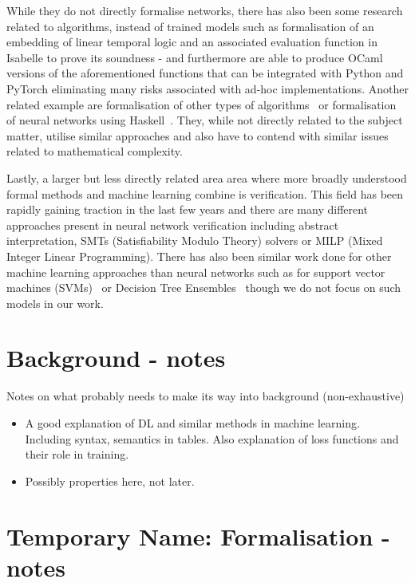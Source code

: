 \documentclass[a4paper,UKenglish,cleveref, autoref, thm-restate]{lipics-v2021}
\begin{document}
While they do not directly formalise networks, there has also been some research related to algorithms, instead of trained models such as formalisation of an embedding of linear temporal logic and an associated evaluation function in Isabelle to prove its soundness - and furthermore are able to produce OCaml versions of the aforementioned functions that can be integrated with Python and PyTorch eliminating many risks associated with ad-hoc implementations\cite{chevallier2022constrained}. Another related example are formalisation of other types of algorithms~\cite{daukantas2021trimming} or formalisation of neural networks using Haskell~\cite{xie2023haskell}. They, while not directly related to the subject matter, utilise similar approaches and also have to contend with similar issues related to mathematical complexity.

Lastly, a larger but less directly related area area where more broadly understood formal methods and machine learning combine is verification. This field has been rapidly gaining traction in the last few years and there are many different approaches present in neural network verification\cite{urban2021review,9842406,easterbrook1998formal} including abstract interpretation, SMTs (Satisfiability Modulo Theory) \cite{katz2019marabou} solvers or MILP (Mixed Integer Linear Programming). There has also been similar work done for other machine learning approaches than neural networks such as for support vector machines (SVMs)~\cite{ranzato2019robustness} or Decision Tree Ensembles~\cite{einziger2019verifying} though we do not focus on such models in our work. 




\section{Background - notes}


Notes on what probably needs to make its way into background (non-exhaustive)
\begin{itemize}
	\item A good explanation of DL and similar methods in machine learning. Including syntax, semantics in tables. Also explanation of loss functions and their role in training.
	\item Possibly properties here, not later.
\end{itemize}






\section{Temporary Name: Formalisation - notes}
\end{document}
